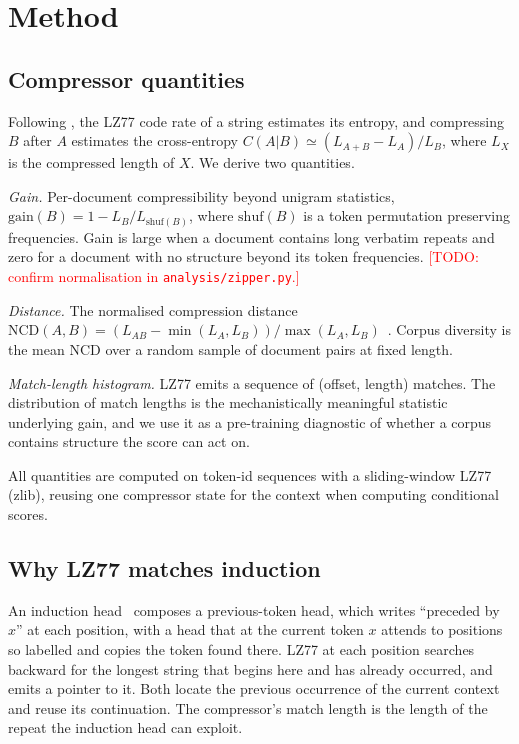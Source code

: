 \documentclass[11pt]{article}
\newcommand{\todo}[1]{\textcolor{red}{[TODO: #1]}}
\newcommand{\gain}{\mathrm{gain}}
\newcommand{\ncd}{\mathrm{NCD}}
\begin{document}
\section{Method}\label{sec:method}

\subsection{Compressor quantities}
Following \citet{baronchelli2005zippers}, the LZ77 code rate of a string
estimates its entropy, and compressing $B$ after $A$ estimates the
cross-entropy $C(A|B)\simeq(L_{A+B}-L_A)/L_B$, where $L_X$ is the
compressed length of $X$. We derive two quantities.

\emph{Gain.} Per-document compressibility beyond unigram statistics,
$\gain(B)=1-L_B/L_{\mathrm{shuf}(B)}$, where $\mathrm{shuf}(B)$ is a token
permutation preserving frequencies. Gain is large when a document contains
long verbatim repeats and zero for a document with no structure beyond its
token frequencies. \todo{confirm normalisation in \texttt{analysis/zipper.py}.}

\emph{Distance.} The normalised compression distance
$\ncd(A,B)=(L_{AB}-\min(L_A,L_B))/\max(L_A,L_B)$~\citep{li2004ncd}.
Corpus diversity is the mean $\ncd$ over a random sample of document pairs
at fixed length.

\emph{Match-length histogram.} LZ77 emits a sequence of (offset, length)
matches. The distribution of match lengths is the mechanistically
meaningful statistic underlying gain, and we use it as a pre-training
diagnostic of whether a corpus contains structure the score can act on.

All quantities are computed on token-id sequences with a sliding-window
LZ77 (zlib), reusing one compressor state for the context when computing
conditional scores.

\subsection{Why LZ77 matches induction}
An induction head~\citep{olsson2022induction} composes a previous-token
head, which writes ``preceded by $x$'' at each position, with a head that at
the current token $x$ attends to positions so labelled and copies the token
found there. LZ77 at each position searches backward for the longest string
that begins here and has already occurred, and emits a pointer to it. Both
locate the previous occurrence of the current context and reuse its
continuation. The compressor's match length is the length of the repeat
the induction head can exploit.
\end{document}
